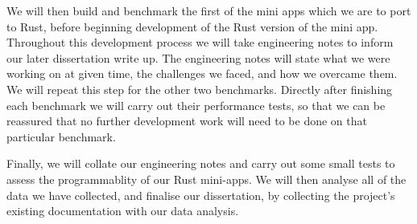 \documentclass{report}[a4]
\begin{document}
We will then build and benchmark the first of the mini apps which we are to port to Rust, before beginning development of the Rust version of the mini app. Throughout this development process we will take engineering notes to inform our later dissertation write up. The engineering notes will state what we were working on at given time, the challenges we faced, and how we overcame them. We will repeat this step for the other two benchmarks. Directly after finishing each benchmark we will carry out their performance tests, so that we can be reassured that no further development work will need to be done on that particular benchmark.

Finally, we will collate our engineering notes and carry out some small tests to assess the programmablity of our Rust mini-apps. We will then analyse all of the data we have collected, and finalise our dissertation, by collecting the project's existing documentation with our data analysis.
\end{document}
